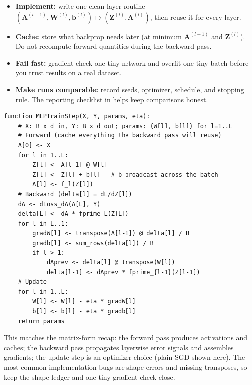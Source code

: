 \begin{tcolorbox}[summarybox, title={Derivation closure: implement, cache, fail-fast}]
\begin{itemize}
    \item \textbf{Implement:} write one clean layer routine \((\mathbf{A}^{(l-1)}, \mathbf{W}^{(l)}, \mathbf{b}^{(l)}) \mapsto (\mathbf{Z}^{(l)}, \mathbf{A}^{(l)})\), then reuse it for every layer.
    \item \textbf{Cache:} store what backprop needs later (at minimum \(\mathbf{A}^{(l-1)}\) and \(\mathbf{Z}^{(l)}\)). Do not recompute forward quantities during the backward pass.
    \item \textbf{Fail fast:} gradient-check one tiny network and overfit one tiny batch before you trust results on a real dataset.
    \item \textbf{Make runs comparable:} record seeds, optimizer, schedule, and stopping rule. The reporting checklist in  helps keep comparisons honest.
\end{itemize}
\end{tcolorbox}

\begin{tcolorbox}[summarybox, breakable, title={Backpropagation (dense MLP) pseudocode}]
\footnotesize
\begin{verbatim}
function MLPTrainStep(X, Y, params, eta):
    # X: B x d_in, Y: B x d_out; params: {W[l], b[l]} for l=1..L
    # Forward (cache everything the backward pass will reuse)
    A[0] <- X
    for l in 1..L:
        Z[l] <- A[l-1] @ W[l]
        Z[l] <- Z[l] + b[l]   # b broadcast across the batch
        A[l] <- f_l(Z[l])
    # Backward (delta[l] = dL/dZ[l])
    dA <- dLoss_dA(A[L], Y)
    delta[L] <- dA * fprime_L(Z[L])
    for l in L..1:
        gradW[l] <- transpose(A[l-1]) @ delta[l] / B
        gradb[l] <- sum_rows(delta[l]) / B
        if l > 1:
            dAprev <- delta[l] @ transpose(W[l])
            delta[l-1] <- dAprev * fprime_{l-1}(Z[l-1])
    # Update
    for l in 1..L:
        W[l] <- W[l] - eta * gradW[l]
        b[l] <- b[l] - eta * gradb[l]
    return params
\end{verbatim}
\normalsize
This matches the matrix-form recap: the forward pass produces activations and caches; the backward pass propagates layerwise error signals and assembles gradients; the update step is an optimizer choice (plain SGD shown here). The most common implementation bugs are shape errors and missing transposes, so keep the shape ledger and one tiny gradient check close.
\end{tcolorbox}


